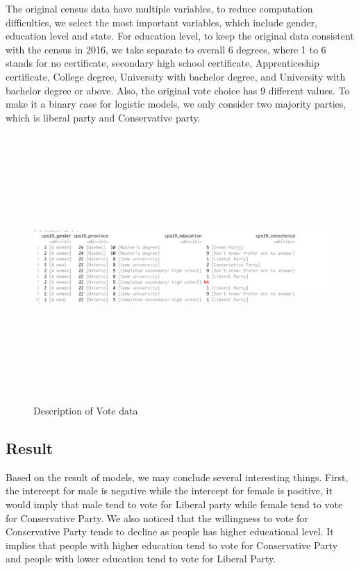 \documentclass[
]{article}
\begin{document}
The original census data have multiple variables, to reduce computation
difficulties, we select the most important variables, which include
gender, education level and state. For education level, to keep the
original data consistent with the census in 2016, we take separate to
overall 6 degrees, where 1 to 6 stands for no certificate, secondary
high school certificate, Apprenticeship certificate, College degree,
University with bachelor degree, and University with bachelor degree or
above. Also, the original vote choice has 9 different values. To make it
a binary case for logistic models, we only consider two majority
parties, which is liberal party and Conservative party.

\begin{figure}
    \centering
    \includegraphics[height=4in]{P1.png}
    \caption{Description of Vote data}
\end{figure}

\hypertarget{result}{%
\subsection{Result}\label{result}}

Based on the result of models, we may conclude several interesting
things. First, the intercept for male is negative while the intercept
for female is positive, it would imply that male tend to vote for
Liberal party while female tend to vote for Conservative Party. We also
noticed that the willingness to vote for Conservative Party tends to
decline as people has higher educational level. It implies that people
with higher education tend to vote for Conservative Party and people
with lower education tend to vote for Liberal Party.
\end{document}
